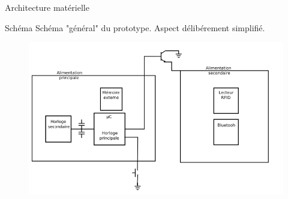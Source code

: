 \begin{frame}{Architecture matérielle}
	\begin{block}{Schéma}
        Schéma "général" du prototype. Aspect délibérement simplifié.
	\end{block}

    \begin{figure}[h]
        \begin{center}
            \includegraphics[scale=0.4]{images/protoSchema.png} 
        \end{center}
     \end{figure} 
\end{frame}
